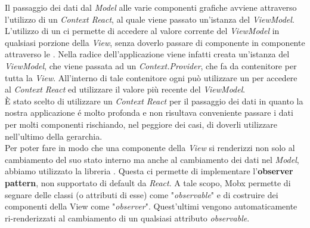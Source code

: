 Il passaggio dei dati dal \textit{Model} alle varie componenti grafiche avviene attraverso l'utilizzo di un \textit{Context React}, al quale viene passato un'istanza del \textit{ViewModel}. L'utilizzo di un  ci permette di accedere al valore corrente del \textit{ViewModel} in qualsiasi porzione della \textit{View}, senza doverlo passare di componente in componente attraverso le . Nella radice dell'applicazione viene infatti creata un'istanza del \textit{ViewModel}, che viene passata ad un \textit{Context.Provider}, che fa da contenitore per tutta la \textit{View}. All'interno di tale contenitore ogni  può utilizzare un  per accedere al \textit{Context React} ed utilizzare il valore più recente del \textit{ViewModel}.\\ È stato scelto di utilizzare un \textit{Context React} per il passaggio dei dati in quanto la nostra applicazione é molto profonda e non risultava conveniente passare i dati per molti componenti rischiando, nel peggiore dei casi, di doverli utilizzare nell'ultimo della gerarchia.\\
Per poter fare in modo che una componente della \textit{View} si renderizzi non solo al cambiamento del suo stato interno ma anche al cambiamento dei dati nel \textit{Model}, abbiamo utilizzato la libreria . Questa ci permette di implementare l'\textbf{observer pattern}, non supportato di default da \textit{React}. A tale scopo, Mobx permette di segnare delle classi (o attributi di esse) come "\textit{observable}" e di costruire dei componenti della View come "\textit{observer}". Quest'ultimi vengono automaticamente ri-renderizzati al cambiamento di un qualsiasi attributo \textit{observable}.
\newpage

